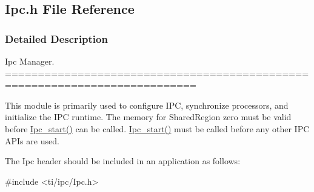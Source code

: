 \subsection{Ipc.\-h File Reference}
\label{_ipc_8h}


\subsubsection{Detailed Description}
Ipc Manager. ===========================================================================

This module is primarily used to configure I\-P\-C, synchronize processors, and initialize the I\-P\-C runtime. The memory for Shared\-Region zero must be valid before \hyperlink{_ipc_8h_aca550c6a5498637cfec7b0f4e6d07828}{Ipc\-\_\-start()} can be called. \hyperlink{_ipc_8h_aca550c6a5498637cfec7b0f4e6d07828}{Ipc\-\_\-start()} must be called before any other I\-P\-C A\-P\-Is are used.

The Ipc header should be included in an application as follows\-: 
\begin{DoxyCode}
\textcolor{preprocessor}{    #include <ti/ipc/Ipc.h>}
\end{DoxyCode}
 

